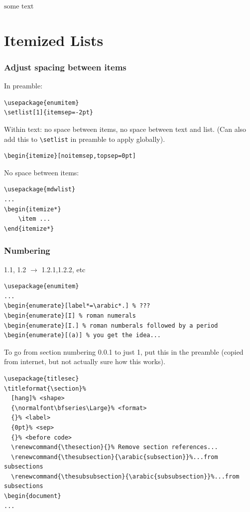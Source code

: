 \documentclass{article}
\begin{document}
$\textrm{some\ text}$ %


\section{Itemized Lists}

\subsubsection{Adjust spacing between items}
In preamble:
\begin{verbatim}
\usepackage{enumitem}
\setlist[1]{itemsep=-2pt}
\end{verbatim}

Within text:
no space between items, no space between text and list.
(Can also add this to \verb|\setlist| in preamble to apply globally).
\begin{verbatim}
\begin{itemize}[noitemsep,topsep=0pt]
\end{verbatim}

No space between items:
\begin{verbatim}
\usepackage{mdwlist}
...
\begin{itemize*}
    \item ...
\end{itemize*}
\end{verbatim}

\subsubsection{Numbering}
1.1, 1.2 $\rightarrow$ 1.2.1,1.2.2, etc
\begin{verbatim}
\usepackage{enumitem}
...
\begin{enumerate}[label*=\arabic*.] % ???
\begin{enumerate}[I] % roman numerals
\begin{enumerate}[I.] % roman numberals followed by a period
\begin{enumerate}[(a)] % you get the idea...
\end{verbatim}

To go from section numbering 0.0.1 to just 1,
put this in the preamble
(copied from internet, but not actually sure how this works).
\begin{verbatim}
\usepackage{titlesec}
\titleformat{\section}%
  [hang]% <shape>
  {\normalfont\bfseries\Large}% <format>
  {}% <label>
  {0pt}% <sep>
  {}% <before code>
  \renewcommand{\thesection}{}% Remove section references...
  \renewcommand{\thesubsection}{\arabic{subsection}}%...from subsections
  \renewcommand{\thesubsubsection}{\arabic{subsubsection}}%...from subsections
\begin{document}
...
\end{verbatim}
\end{document}
